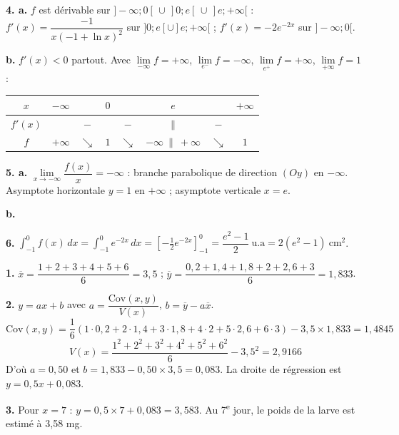 \documentclass[11pt]{article}
\begin{document}
\textbf{4. a.} $f$ est dérivable sur $]-\infty;0[\,\cup\,]0;e[\,\cup\,]e;+\infty[$ : $f'(x) = \dfrac{-1}{x(-1+\ln x)^2}$ sur $]0;e[\cup]e;+\infty[$ ; $f'(x) = -2e^{-2x}$ sur $]-\infty;0[$.

\textbf{b.} $f'(x) < 0$ partout. Avec $\lim\limits_{-\infty} f = +\infty$, $\lim\limits_{e^-} f = -\infty$, $\lim\limits_{e^+} f = +\infty$, $\lim\limits_{+\infty} f = 1$ :
\begin{center}\renewcommand{\arraystretch}{1.4}
\begin{tabular}{|c|ccccccc|}
\hline $x$ & $-\infty$ & & $0$ & & $e$ & & $+\infty$ \\\hline $f'(x)$ & & $-$ & & $-$ & $\|$ & $-$ & \\\hline
$f$ & $+\infty$ & $\searrow$ & $1$ & $\searrow$ & $-\infty\ \|\ +\infty$ & $\searrow$ & $1$ \\\hline
\end{tabular}
\end{center}

\textbf{5. a.} $\lim\limits_{x\to-\infty}\dfrac{f(x)}{x} = -\infty$ : branche parabolique de direction $(Oy)$ en $-\infty$. Asymptote horizontale $y = 1$ en $+\infty$ ; asymptote verticale $x = e$.

\textbf{b.}
\begin{center}
\end{center}

\textbf{6.} $\displaystyle\int_{-1}^0 f(x)\,dx = \int_{-1}^0 e^{-2x}\,dx = \left[-\tfrac{1}{2}e^{-2x}\right]_{-1}^0 = \dfrac{e^2 - 1}{2}\ \text{u.a} = 2(e^2 - 1)\ \text{cm}^2$.

\textbf{1.} $\overline{x} = \dfrac{1+2+3+4+5+6}{6} = 3{,}5$ ; \quad $\overline{y} = \dfrac{0{,}2 + 1{,}4 + 1{,}8 + 2 + 2{,}6 + 3}{6} = 1{,}833$.

\textbf{2.} $y = ax + b$ avec $a = \dfrac{\mathrm{Cov}(x,y)}{V(x)}$, $b = \overline{y} - a\overline{x}$.
\[ \mathrm{Cov}(x,y) = \frac{1}{6}(1\cdot 0{,}2 + 2\cdot 1{,}4 + 3\cdot 1{,}8 + 4\cdot 2 + 5\cdot 2{,}6 + 6\cdot 3) - 3{,}5\times 1{,}833 = 1{,}4845 \]
\[ V(x) = \frac{1^2 + 2^2 + 3^2 + 4^2 + 5^2 + 6^2}{6} - 3{,}5^2 = 2{,}9166 \]
D'où $a = 0{,}50$ et $b = 1{,}833 - 0{,}50\times 3{,}5 = 0{,}083$. La droite de régression est $y = 0{,}5x + 0{,}083$.

\textbf{3.} Pour $x = 7$ : $y = 0{,}5\times 7 + 0{,}083 = 3{,}583$. Au 7\textsuperscript{e} jour, le poids de la larve est estimé à 3,58 mg.
\end{document}
